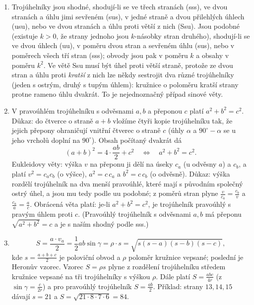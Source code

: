 \begin{enumerate}[label=\textbf{\arabic*.}, leftmargin=*, itemsep=0.8em]
  \item {}
  Trojúhelníky jsou shodné, shodují-li se ve třech stranách (sss), ve dvou stranách a úhlu jimi sevřeném (sus), v jedné straně a dvou přilehlých úhlech (usu), nebo ve dvou stranách a úhlu proti větší z nich (Ssu). Jsou podobné (existuje $k > 0$, že strany jednoho jsou $k$-násobky stran druhého), shodují-li se ve dvou úhlech (uu), v poměru dvou stran a sevřeném úhlu (sus), nebo v poměrech všech tří stran (sss); obvody jsou pak v poměru $k$ a obsahy v poměru $k^2$. Ve větě Ssu musí být úhel proti větší straně, protože ze dvou stran a úhlu proti \emph{kratší} z nich lze někdy sestrojit dva různé trojúhelníky (jeden s ostrým, druhý s tupým úhlem): kružnice o poloměru kratší strany protne rameno úhlu dvakrát. To je nejednoznačný případ sinové věty.

  \item {}
  V pravoúhlém trojúhelníku s odvěsnami $a, b$ a přeponou $c$ platí $a^2 + b^2 = c^2$. Důkaz: do čtverce o straně $a + b$ vložíme čtyři kopie trojúhelníku tak, že jejich přepony ohraničují vnitřní čtverec o straně $c$ (úhly $\alpha$ a $90^\circ - \alpha$ se u jeho vrcholů doplní na $90^\circ$). Obsah počítaný dvakrát dá
  \begin{equation*}
    {(a + b)}^2 = 4\cdot\frac{ab}{2} + c^2 \quad\Leftrightarrow\quad a^2 + b^2 = c^2.
  \end{equation*}
  Eukleidovy věty: výška $v$ na přeponu ji dělí na úseky $c_a$ (u odvěsny $a$) a $c_b$, a platí $v^2 = c_ac_b$ (o výšce), $a^2 = c\,c_a$ a $b^2 = c\,c_b$ (o odvěsně). Důkaz: výška rozdělí trojúhelník na dva menší pravoúhlé, které mají s původním společný ostrý úhel, a jsou mu tedy podle uu podobné; z poměrů stran plyne $\frac{v}{c_a} = \frac{c_b}{v}$ a $\frac{c_a}{a} = \frac{a}{c}$. Obrácená věta platí: je-li $a^2 + b^2 = c^2$, je trojúhelník pravoúhlý s pravým úhlem proti $c$. (Pravoúhlý trojúhelník s odvěsnami $a, b$ má přeponu $\sqrt{a^2 + b^2} = c$ a je s naším shodný podle sss.) 

  \item {}
  \begin{equation*}
    S = \frac{a\cdot v_a}{2} = \frac{1}{2}ab\sin\gamma = \rho\cdot s = \sqrt{s(s - a)(s - b)(s - c)},
  \end{equation*}
  kde $s = \frac{a + b + c}{2}$ je poloviční obvod a $\rho$ poloměr kružnice vepsané; poslední je Heronův vzorec. Vzorec $S = \rho s$ plyne z rozdělení trojúhelníku středem kružnice vepsané na tři trojúhelníky s výškou $\rho$. Dále platí $S = \frac{abc}{4r}$ (z $\sin\gamma = \frac{c}{2r}$) a pro pravoúhlý trojúhelník $S = \frac{ab}{2}$. Příklad: strany $13, 14, 15$ dávají $s = 21$ a $S = \sqrt{21\cdot 8\cdot 7\cdot 6} = 84$. 


\end{enumerate}
